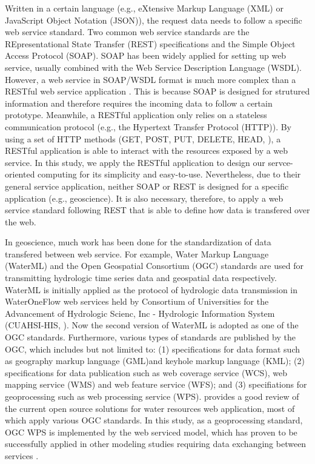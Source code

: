 \documentclass[review]{elsarticle}
\begin{document}
Written in a certain language (e.g., eXtensive Markup Language (XML) or JavaScript Object Notation (JSON)), the request data needs to follow a specific web service standard. Two common web service standards are the REpresentational State Transfer (REST) specifications and the Simple Object Access Protocol (SOAP). SOAP has been widely applied for setting up web service, usually combined with the Web Service Description Language (WSDL). However, a web service in SOAP/WSDL format is much more complex than a RESTful web service application \citep{mulligan2009}. This is because SOAP is designed for strutured information and therefore requires the incoming data to follow a certain prototype. Meanwhile, a RESTful application only relies on a stateless communication protocol (e.g., the Hypertext Transfer Protocol (HTTP)). By using a set of HTTP methods (GET, POST, PUT, DELETE, HEAD, \cite{fielding1999}), a RESTful application is able to interact with the resources exposed by a web service. In this study, we apply the RESTful application to design our servce-oriented computing for its simplicity and easy-to-use. Nevertheless, due to their general service application, neither SOAP or REST is designed for a specific application (e.g., geoscience). It is also necessary, therefore, to apply a web service standard following REST that is able to define how data is transfered over the web.

In geoscience, much work has been done for the standardization of data transfered between web service. For example, Water Markup Language (WaterML) and the Open Geospatial Consortium (OGC) standards are used for transmitting hydrologic time series data and geospatial data respectively. WaterML is initially applied as the protocol of hydrologic data transmission in WaterOneFlow web services held by Consortium of Universities for the Advancement of Hydrologic Scienc, Inc - Hydrologic Information System (CUAHSI-HIS, \cite{valentine2007}). Now the second version of WaterML is adopted as one of the OGC standards. Furthermore, various types of standards are published by the OGC, which includes but not limited to: (1) specifications for data format such as geography markup language (GML)and keyhole markup language (KML); (2) specifications for data publication such as web coverage service (WCS), web mapping service (WMS) and web feature service (WFS); and (3) specifiations for geoprocessing such as web processing service (WPS).\cite{swain2015} provides a good review of the current open source solutions for water resources web application, most of which apply various OGC standards. In this study, as a geoprocessing standard, OGC WPS is implemented by the web serviced model, which has proven to be successfully applied in other modeling studies requiring data exchanging between services \citep{castronova2013, goodall2011, schaeffer2008,vitolo2012}.
\end{document}
